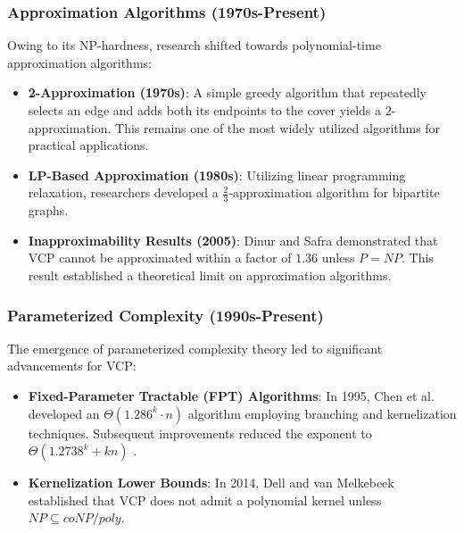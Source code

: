 \documentclass[acmsmall]{acmart}
\begin{document}
	\subsubsection{Approximation Algorithms (1970s-Present)}
	\hspace{1.2em}Owing to its NP-hardness, research shifted towards polynomial-time approximation algorithms:
	
	\begin{itemize}
		\item \textbf{2-Approximation (1970s)}: A simple greedy algorithm that repeatedly selects an edge and adds both its endpoints to the cover yields a 2-approximation\cite{garey1979computers}. This remains one of the most widely utilized algorithms for practical applications.
		
		\item \textbf{LP-Based Approximation (1980s)}: Utilizing linear programming relaxation, researchers developed a \( \frac{2}{3} \)-approximation algorithm for bipartite graphs.\cite{1998An}
		
		\item \textbf{Inapproximability Results (2005)}: Dinur and Safra demonstrated that VCP cannot be approximated within a factor of \( 1.36 \) unless \( P = NP \)\cite{dinur2005analytical}. This result established a theoretical limit on approximation algorithms.
	\end{itemize}
	
	\subsubsection{Parameterized Complexity (1990s-Present)}
	\hspace{1.2em}The emergence of parameterized complexity theory led to significant advancements for VCP:
	
	\begin{itemize}
		\item \textbf{Fixed-Parameter Tractable (FPT) Algorithms}: In 1995, Chen et al. developed an \( \Theta(1.286^k \cdot n) \) algorithm employing branching and kernelization techniques\cite{chen2006improved}. Subsequent improvements reduced the exponent to \( \Theta(1.2738^k + kn) \) \cite{fomin2016exact}.
		
		\item \textbf{Kernelization Lower Bounds}: In 2014, Dell and van Melkebeek established that VCP does not admit a polynomial kernel unless \( NP \subseteq coNP/poly \)\cite{2014Satisfiability}.
	\end{itemize}
	
\end{document}
